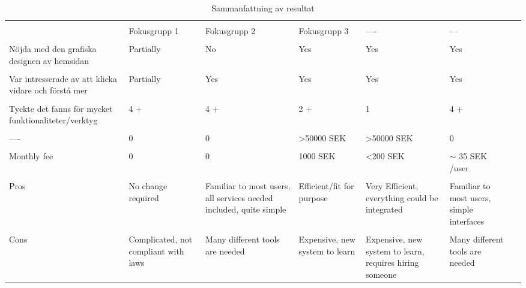 \begin{table*}[!t]
\centering
\caption{Sammanfattning av resultat}
\label{tab:cost-proposals}
\begin{tabularx}{\linewidth}{XXXXXXX} %
\toprule \\
& Fokusgrupp 1    & Fokusgrupp 2           & Fokusgrupp 3                                                  & ----               & ---         &                                          \\
\toprule \\
Nöjda med den grafiska designen av hemsidan   		& Partially                           & No                                                               & Yes                           & Yes                                                   & Yes                                      \\
\midrule \\
Var intresserade av att klicka vidare och förstå mer     	& Partially                           & Yes                                                              & Yes                           & Yes                                                   & Yes                                      \\
\midrule \\
Tyckte det fanns för mycket funktionaliteter/verktyg     & 4 +                                 & 4 +                                                              & 2 +                           & 1                                                     & 4 +                                      \\
\midrule \\
---- & 0                                   & 0                                                                & \textgreater 50000 SEK         & \textgreater 50000 SEK                                 & 0                                        \\
\midrule \\
Monthly fee         & 0                                   & 0                                                                & 1000 SEK                       & \textless 200 SEK                                      & $\sim$ 35 SEK /user                       \\
\midrule \\
Pros                & No change required                  & Familiar to most users, all services needed included, quite simple & Efficient/fit for purpose     & Very Efficient, everything could be integrated        & Familiar to most users, simple interfaces \\
\midrule \\
Cons                & Complicated, not compliant with laws & Many different tools are needed                                  & Expensive, new system to learn & Expensive, new system to learn, requires hiring someone & Many different tools are needed \\  
\bottomrule
\end{tabularx}
\end{table*}